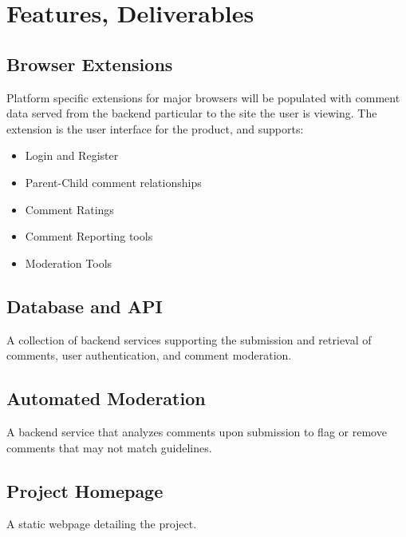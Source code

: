 \documentclass[proposal.tex]{subfiles}
\begin{document}
    
\section{Features, Deliverables}

\subsection{Browser Extensions}

Platform specific extensions for major browsers will be populated with comment data served from the backend particular to the site the user is viewing.
The extension is the user interface for the product, and supports:

\begin{itemize}
    \item Login and Register
    \item Parent-Child comment relationships
    \item Comment Ratings
    \item Comment Reporting tools
    \item Moderation Tools
\end{itemize}

\subsection{Database and API}

A collection of backend services supporting the submission and retrieval of comments, user authentication, and comment moderation.

\subsection{Automated Moderation}

A backend service that analyzes comments upon submission to flag or remove comments that may not match guidelines.

\subsection{Project Homepage}

A static webpage detailing the project.
\end{document}
